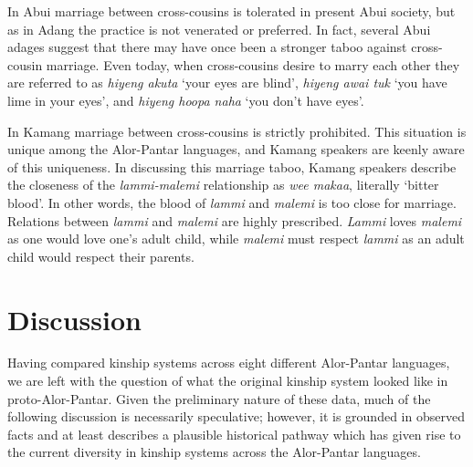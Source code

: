 In Abui marriage between cross-cousins is tolerated in present Abui society, but as in Adang the practice is not venerated or preferred. In fact, several Abui adages suggest that there may have once been a stronger taboo against cross-cousin marriage. Even today, when cross-cousins desire to marry each other they are referred to as \textit{hiyeng akuta} `your eyes are blind', \textit{hiyeng awai tuk} `you have lime in your eyes', and \textit{hiyeng hoopa naha} `you don't have eyes'.

In Kamang marriage between cross-cousins is strictly prohibited. This situation is unique among the Alor-Pantar languages, and Kamang speakers are keenly aware of this uniqueness. In discussing this marriage taboo, Kamang speakers describe the closeness of the \textit{lammi-malemi} relationship as \textit{wee makaa}, literally `bitter blood'. In other words, the blood of \textit{lammi} and \textit{malemi} is too close for marriage. Relations between \textit{lammi} and \textit{malemi} are highly prescribed. \textit{Lammi} loves \textit{malemi} as one would love one's adult child, while \textit{malemi} must respect \textit{lammi} as an adult child would respect their parents.

\section{Discussion}\label{sec:5:5}
Having compared kinship systems across eight different Alor-Pantar languages, we are left with the question of what the original kinship system looked like in proto-Alor-Pantar. Given the preliminary nature of these data, much of the following discussion is necessarily speculative; however, it is grounded in observed facts and at least describes a plausible historical pathway which has given rise to the current diversity in kinship systems across the Alor-Pantar languages.

